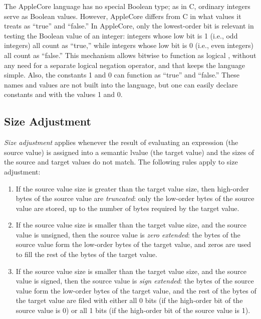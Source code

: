 \documentclass[10pt]{article}
\begin{document}
The AppleCore language has no special Boolean type; as in C, ordinary
integers serve as Boolean values.  However, AppleCore differs from C
in what values it treats as ``true'' and ``false.''  In AppleCore,
only the lowest-order bit is relevant in testing the Boolean value of
an integer: integers whose low bit is 1 (i.e., odd integers) all count
as ``true,'' while integers whose low bit is 0 (i.e., even integers)
all count as ``false.''  This mechanism allows bitwise  to
function as logical , without any need for a separate logical
negation operator, and that keeps the language simple.  Also, the
constants 1 and 0 can function as ``true'' and ``false.''  These names
and values are not built into the language, but one can easily declare
constants  and  with the values 1 and 0.

\subsection{Size Adjustment}
\label{sec:code-gen:size-adjustment}

\emph{Size adjustment} applies whenever the result of evaluating an
expression (the source value) is assigned into a semantic lvalue (the
target value) and the sizes of the source and target values do not
match.  The following rules apply to size adjustment:
%
\begin{enumerate}
%
\item If the source value size is greater than the target value size,
  then high-order bytes of the source value are \emph{truncated}: only
  the low-order bytes of the source value are stored, up to the number
  of bytes required by the target value.
%
\item If the source value size is smaller than the target value size,
  and the source value is unsigned, then the source value is
  \emph{zero extended}:  the bytes of the source value form the
  low-order bytes of the target value, and zeros are used to fill the
  rest of the bytes of the target value.
%
\item If the source value size is smaller than the target value size,
  and the source value is signed, then the source value is \emph{sign
    extended}: the bytes of the source value form the low-order bytes
  of the target value, and the rest of the bytes of the target value
  are filed with either all 0 bits (if the high-order bit of the
  source value is 0) or all 1 bits (if the high-order bit of the
  source value is 1).
%
\end{enumerate}
\end{document}
